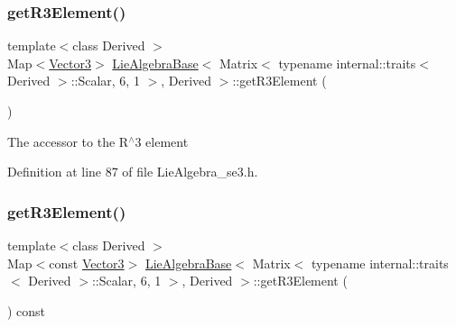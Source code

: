 \subsubsection{\texorpdfstring{get\+R3\+Element()}{getR3Element()}\hspace{0.1cm}{\footnotesize\ttfamily [1/2]}}
{\footnotesize\ttfamily template$<$class Derived $>$ \\
Map$<$\hyperlink{class_lie_algebra_base_3_01_matrix_3_01typename_01internal_1_1traits_3_01_derived_01_4_1_1_scala449314c781550590437697c4dc21a6d4_a18592115cf68b8c745a44d07305df4d2}{Vector3}$>$ \hyperlink{class_lie_algebra_base}{Lie\+Algebra\+Base}$<$ Matrix$<$ typename internal\+::traits$<$ Derived $>$\+::Scalar, 6, 1 $>$, Derived $>$\+::get\+R3\+Element (\begin{DoxyParamCaption}{ }\end{DoxyParamCaption})\hspace{0.3cm}{\ttfamily [inline]}}

The accessor to the R$^\wedge$3 element 

Definition at line 87 of file Lie\+Algebra\+\_\+se3.\+h.

\hypertarget{class_lie_algebra_base_3_01_matrix_3_01typename_01internal_1_1traits_3_01_derived_01_4_1_1_scala449314c781550590437697c4dc21a6d4_a12558704431a4884ea9c81a7c6e1d59e}{}\label{class_lie_algebra_base_3_01_matrix_3_01typename_01internal_1_1traits_3_01_derived_01_4_1_1_scala449314c781550590437697c4dc21a6d4_a12558704431a4884ea9c81a7c6e1d59e} 
\subsubsection{\texorpdfstring{get\+R3\+Element()}{getR3Element()}\hspace{0.1cm}{\footnotesize\ttfamily [2/2]}}
{\footnotesize\ttfamily template$<$class Derived $>$ \\
Map$<$const \hyperlink{class_lie_algebra_base_3_01_matrix_3_01typename_01internal_1_1traits_3_01_derived_01_4_1_1_scala449314c781550590437697c4dc21a6d4_a18592115cf68b8c745a44d07305df4d2}{Vector3}$>$ \hyperlink{class_lie_algebra_base}{Lie\+Algebra\+Base}$<$ Matrix$<$ typename internal\+::traits$<$ Derived $>$\+::Scalar, 6, 1 $>$, Derived $>$\+::get\+R3\+Element (\begin{DoxyParamCaption}{ }\end{DoxyParamCaption}) const\hspace{0.3cm}{\ttfamily [inline]}}

